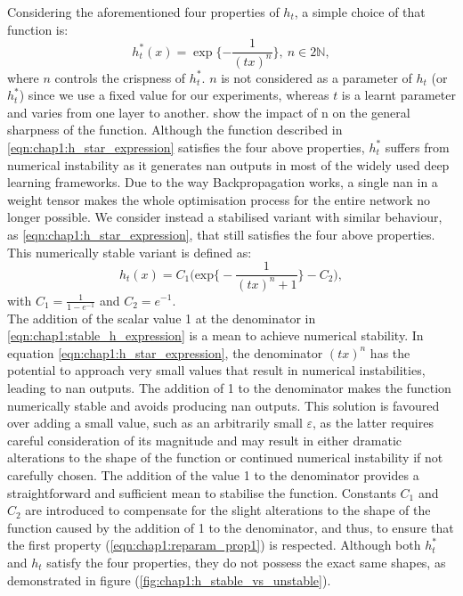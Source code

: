 Considering the aforementioned four properties of $h_t$, a simple choice of that
function is:
\begin{equation}
  \label{eqn:chap1:h_star_expression}
  h_t^*(x) = \exp\bigg\{{-\displaystyle\frac{1}{(tx)^n}}\bigg\}, ~ n\in 2\mathds{N},
\end{equation}
\noindent where $n$ controls the crispness of $h_t^*$. $n$ is not considered as
a parameter of $h_t$ (or $h_t^*$) since we use a fixed value for our
experiments, whereas $t$ is a learnt parameter and varies from one layer to
another.  show the impact of n on the
general sharpness of the function. Although the function described in
\cref{eqn:chap1:h_star_expression} satisfies the four above properties, $h_t^*$
suffers from numerical instability as it generates \ac{nan} outputs in most of
the widely used deep learning frameworks. Due to the way Backpropagation works,
a single \ac{nan} in a weight tensor makes the whole optimisation process for
the entire network no longer possible. We consider instead a stabilised variant
with similar behaviour, as \cref{eqn:chap1:h_star_expression},  that still
satisfies the four above properties. This numerically stable variant is defined
as:
\begin{equation}
  \label{eqn:chap1:stable_h_expression}
  h_t(x) = C_1 \biggl( \text{exp} \bigg\{-\displaystyle\frac{1}{(tx)^n +1}\bigg\} - C_2 \biggr),
\end{equation}
\noindent with $C_1=\frac{1}{1-e^{-1}}$ and $C_2 = e^{-1}$.\\

The addition of the scalar value 1 at the denominator in
\cref{eqn:chap1:stable_h_expression} is a mean to achieve numerical stability.
In equation \cref{eqn:chap1:h_star_expression}, the denominator $(tx)^n$ has the
potential to approach very small values that result in numerical instabilities,
leading to \ac{nan} outputs. The addition of 1 to the denominator makes the
function numerically stable and avoids producing \ac{nan} outputs. This solution
is favoured over adding a small value, such as an arbitrarily small
$\varepsilon$, as the latter requires careful consideration of its magnitude and
may result in either dramatic alterations to the shape of the function or
continued numerical instability if not carefully chosen. The addition of the
value 1 to the denominator provides a straightforward and sufficient mean to
stabilise the function. Constants $C_1$ and $C_2$ are introduced to compensate
for the slight alterations to the shape of the function caused by the addition
of 1 to the denominator, and thus, to ensure that the first property
(\cref{eqn:chap1:reparam_prop1}) is respected. Although both $h_t^*$ and $h_t$
satisfy the four properties, they do not possess the exact same shapes, as
demonstrated in figure (\ref{fig:chap1:h_stable_vs_unstable}).\\

